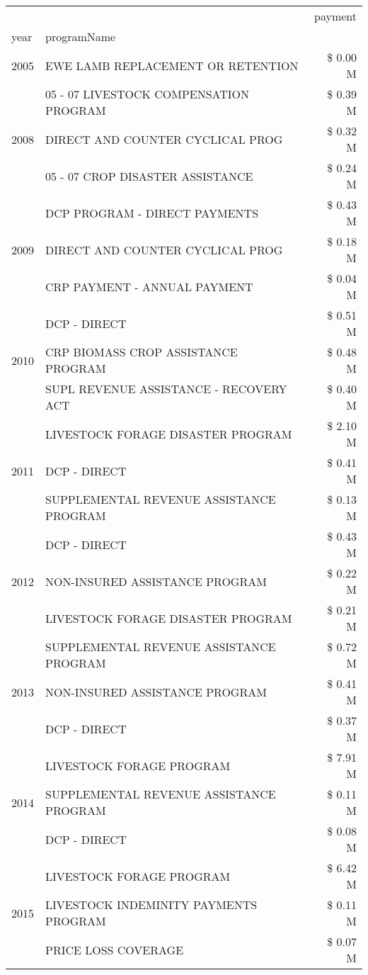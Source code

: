\begin{tabular}{llr}
\toprule
 &  & payment \\
year & programName &  \\
\midrule
2005 & EWE LAMB REPLACEMENT OR RETENTION & \$ 0.00 M \\
\cline{1-3}
\multirow[t]{3}{*}{2008} & 05 - 07 LIVESTOCK COMPENSATION PROGRAM & \$ 0.39 M \\
 & DIRECT AND COUNTER CYCLICAL PROG & \$ 0.32 M \\
 & 05 - 07 CROP DISASTER ASSISTANCE & \$ 0.24 M \\
\cline{1-3}
\multirow[t]{3}{*}{2009} & DCP PROGRAM - DIRECT PAYMENTS & \$ 0.43 M \\
 & DIRECT AND COUNTER CYCLICAL PROG & \$ 0.18 M \\
 & CRP PAYMENT - ANNUAL PAYMENT & \$ 0.04 M \\
\cline{1-3}
\multirow[t]{3}{*}{2010} & DCP - DIRECT & \$ 0.51 M \\
 & CRP BIOMASS CROP ASSISTANCE PROGRAM & \$ 0.48 M \\
 & SUPL REVENUE ASSISTANCE - RECOVERY ACT & \$ 0.40 M \\
\cline{1-3}
\multirow[t]{3}{*}{2011} & LIVESTOCK FORAGE DISASTER PROGRAM & \$ 2.10 M \\
 & DCP - DIRECT & \$ 0.41 M \\
 & SUPPLEMENTAL REVENUE ASSISTANCE PROGRAM & \$ 0.13 M \\
\cline{1-3}
\multirow[t]{3}{*}{2012} & DCP - DIRECT & \$ 0.43 M \\
 & NON-INSURED ASSISTANCE PROGRAM & \$ 0.22 M \\
 & LIVESTOCK FORAGE DISASTER PROGRAM & \$ 0.21 M \\
\cline{1-3}
\multirow[t]{3}{*}{2013} & SUPPLEMENTAL REVENUE ASSISTANCE PROGRAM & \$ 0.72 M \\
 & NON-INSURED ASSISTANCE PROGRAM & \$ 0.41 M \\
 & DCP - DIRECT & \$ 0.37 M \\
\cline{1-3}
\multirow[t]{3}{*}{2014} & LIVESTOCK FORAGE PROGRAM & \$ 7.91 M \\
 & SUPPLEMENTAL REVENUE ASSISTANCE PROGRAM & \$ 0.11 M \\
 & DCP - DIRECT & \$ 0.08 M \\
\cline{1-3}
\multirow[t]{3}{*}{2015} & LIVESTOCK FORAGE PROGRAM & \$ 6.42 M \\
 & LIVESTOCK INDEMINITY PAYMENTS PROGRAM & \$ 0.11 M \\
 & PRICE LOSS COVERAGE & \$ 0.07 M \\

\end{tabular}
